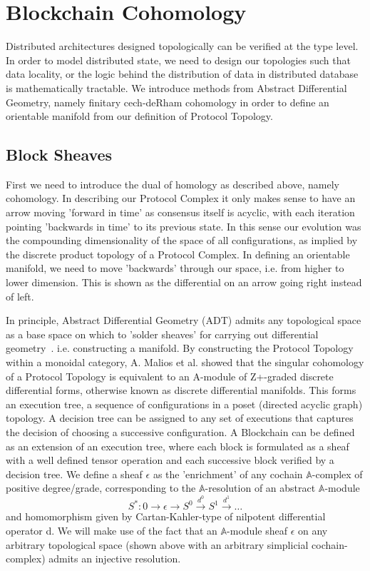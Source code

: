 \documentclass[runningheads]{llncs}
\begin{document}
\section{Blockchain Cohomology}
Distributed architectures designed topologically can be verified at the type level. In order to model distributed state, we need to design our topologies such that data locality, or the logic behind the distribution of data in distributed database is mathematically tractable. We introduce methods from Abstract Differential Geometry, namely finitary cech-deRham cohomology in order to define an orientable manifold from our definition of Protocol Topology.

\subsection{Block Sheaves}
First we need to introduce the dual of homology as described above, namely cohomology. In describing our Protocol Complex it only makes sense to have an arrow moving 'forward in time' as consensus itself is acyclic, with each iteration pointing 'backwards in time' to its previous state. In this sense our evolution was the compounding dimensionality of the space of all configurations, as implied by the discrete product topology of a Protocol Complex. In defining an orientable manifold, we need to move 'backwards' through our space, i.e. from higher to lower dimension. This is shown as the differential on an arrow going right instead of left. 

In principle, Abstract Differential Geometry (ADT) admits any topological space as a base space on which to 'solder sheaves' for carrying out differential geometry~\cite{ref_article6}. i.e. constructing a manifold. By constructing the Protocol Topology within a monoidal category, A. Malios et al. showed that the singular cohomology of a Protocol Topology is equivalent to an A-module of Z+-graded discrete differential forms, otherwise known as discrete differential manifolds. This forms an execution tree, a sequence of configurations in a poset (directed acyclic graph) topology. A decision tree can be assigned to any set of executions that captures the decision of choosing a successive configuration. A Blockchain can be defined as an extension of an execution tree, where each block is formulated as a sheaf with a well defined tensor operation and each successive block verified by a decision tree. We define a sheaf $\epsilon$ as the 'enrichment' of any cochain $\mathbb{A}$-complex of positive degree/grade, corresponding to the $\mathbb{A}$-resolution of an abstract $\mathbb{A}$-module
\begin{equation}
S^*: 0 \rightarrow \epsilon \rightarrow S^0 \xrightarrow{d^0} S^1 \xrightarrow{d^1} \dots
\end{equation}
and homomorphism given by Cartan-Kahler-type of nilpotent differential operator d. We will make use of the fact that an $\mathbb{A}$-module sheaf $\epsilon$ on any arbitrary topological space (shown above with an arbitrary simplicial cochain-complex) admits an injective resolution.
\end{document}

